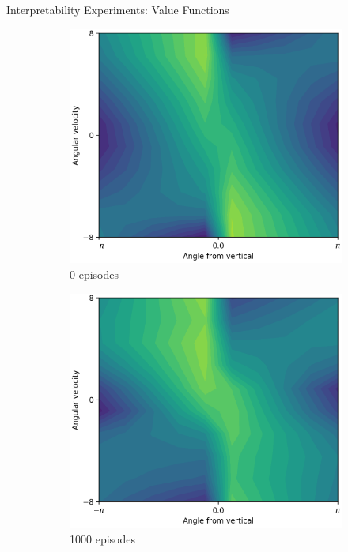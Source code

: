 \documentclass{beamer}
\begin{document}
\begin{frame}{Interpretability Experiments: Value Functions}
\begin{figure}[t]
\begin{subfigure}{0.05\linewidth}
    \end{subfigure}
    \begin{subfigure}{0.30\linewidth}
      \centering
      \includegraphics[width=0.9\linewidth,trim=0 0 0 0,clip]{assets/ref_plots/value_model_refcolexps_r10c2_1_ep0}
      \caption{0 episodes}
    \end{subfigure}
    \begin{subfigure}{0.30\linewidth}
      \centering
      \includegraphics[width=0.9\linewidth,trim=0 0 0 0,clip]{assets/ref_plots/value_model_refcolexps_r10c2_1_ep1000}
      \caption{1000 episodes}
    \end{subfigure}
    \begin{subfigure}{0.30\linewidth}

\end{subfigure}
\end{figure}
\end{frame}
\end{document}
